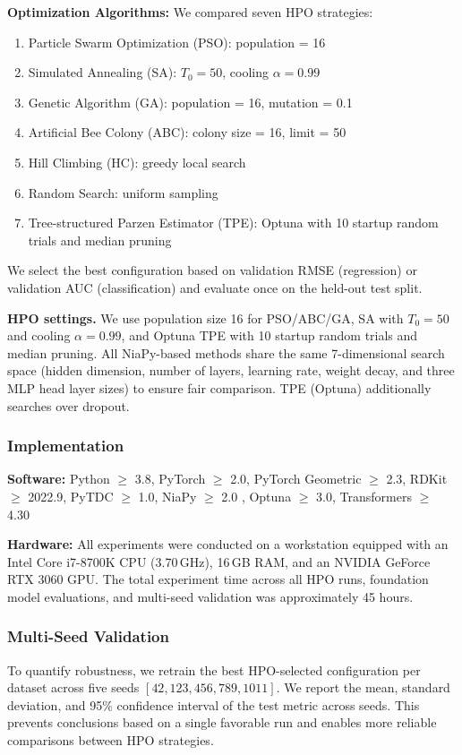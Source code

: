 \documentclass[12pt]{article}
\begin{document}
\textbf{Optimization Algorithms:} We compared seven HPO strategies:
\begin{enumerate}
    \item Particle Swarm Optimization (PSO): population = 16
    \item Simulated Annealing (SA): $T_0=50$, cooling $\alpha=0.99$
    \item Genetic Algorithm (GA): population = 16, mutation = 0.1
    \item Artificial Bee Colony (ABC): colony size = 16, limit = 50
    \item Hill Climbing (HC): greedy local search
    \item Random Search: uniform sampling
    \item Tree-structured Parzen Estimator (TPE): Optuna with 10 startup random trials and median pruning
\end{enumerate}

We select the best configuration based on validation RMSE (regression) or validation AUC (classification) and evaluate once on the held-out test split.

\noindent\textbf{HPO settings.} We use population size 16 for PSO/ABC/GA, SA with $T_0=50$ and cooling $\alpha=0.99$, and Optuna TPE with 10 startup random trials and median pruning. All NiaPy-based methods share the same 7-dimensional search space (hidden dimension, number of layers, learning rate, weight decay, and three MLP head layer sizes) to ensure fair comparison. TPE (Optuna) additionally searches over dropout.



\subsubsection{Implementation}

\textbf{Software:} Python $\ge$ 3.8, PyTorch $\ge$ 2.0, PyTorch Geometric $\ge$ 2.3, RDKit $\ge$ 2022.9, PyTDC $\ge$ 1.0, NiaPy $\ge$ 2.0 \cite{niapy}, Optuna $\ge$ 3.0, Transformers $\ge$ 4.30

\textbf{Hardware:} All experiments were conducted on a workstation equipped with an Intel Core i7-8700K CPU (3.70\,GHz), 16\,GB RAM, and an NVIDIA GeForce RTX 3060 GPU. The total experiment time across all HPO runs, foundation model evaluations, and multi-seed validation was approximately 45 hours.

\subsubsection{Multi-Seed Validation}
To quantify robustness, we retrain the best HPO-selected configuration per dataset across five seeds $[42, 123, 456, 789, 1011]$. We report the mean, standard deviation, and 95\% confidence interval of the test metric across seeds. This prevents conclusions based on a single favorable run and enables more reliable comparisons between HPO strategies.
\end{document}
